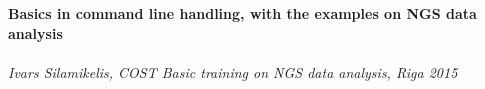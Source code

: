 \documentclass{article}
\begin{document}
  \sloppy
  \begin{center}
  \Large\textbf{Basics in command line handling, with the examples on NGS data analysis}\\~\\
  \large\textit{Ivars Silamikelis, COST Basic training on NGS data analysis, Riga 2015}
  \end{center}
%
  
  
  
  
  
\end{document}
